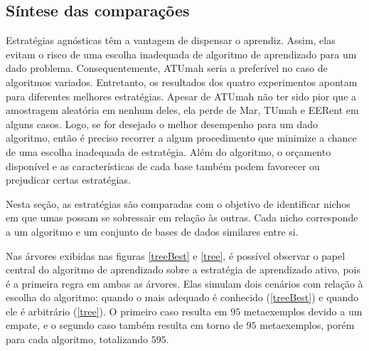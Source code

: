 
\subsection{Síntese das comparações}\label{sintese}
Estratégias agnósticas têm a vantagem de dispensar o aprendiz.
Assim, elas evitam o risco de uma escolha inadequada de algoritmo de aprendizado
para um dado problema.
Consequentemente, ATUmah seria a preferível no caso de algoritmos variados.
Entretanto, os resultados dos quatro experimentos apontam para diferentes melhores
estratégias.
Apesar de ATUmah não ter sido pior que a amostragem aleatória em nenhum deles,
ela perde de Mar, TUmah e EERent em alguns casos.
Logo, se for desejado o melhor desempenho para um dado algoritmo,
então é preciso recorrer a algum procedimento que minimize a chance de
uma escolha inadequada de estratégia.
Além do algoritmo, o orçamento disponível e as características de cada base também
podem favorecer ou prejudicar certas estratégias.

Nesta seção, as estratégias são comparadas com o objetivo de identificar nichos
em que umas possam se sobressair em relação às outras.
Cada nicho corresponde a um algoritmo e um conjunto de bases de dados similares entre si.

Nas árvores exibidas nas figuras \ref{treeBest} e \ref{tree},
é possível observar o papel central do algoritmo de aprendizado sobre
a estratégia de aprendizado ativo, pois é a primeira regra em ambas as árvores.
Elas simulam dois cenários com relação à escolha do algoritmo: quando o mais adequado é conhecido
(\ref{treeBest}) e quando ele é arbitrário (\ref{tree}).
O primeiro caso resulta em $95$ metaexemplos devido a um empate,
e o segundo caso também resulta em torno de $95$ metaexemplos, porém para cada algoritmo,
totalizando $595$.
% 
% 
% 
% 

